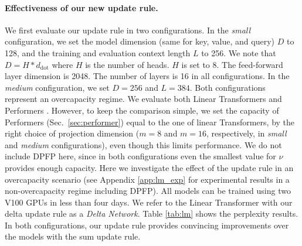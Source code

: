 \documentclass{article}
\theoremstyle{definition}
\begin{document}
\begin{table}[t]
\end{table}

\paragraph{Effectiveness of our new update rule.}
We first evaluate our update rule in two configurations.
In the \textit{small} configuration,
we set the model dimension (same for key, value, and query) $D$ to 128,
and the training and evaluation context length $L$ to 256.
We note that $D=H * d_\text{dot}$ where $H$ is the number of heads.
$H$ is set to 8. The feed-forward layer dimension is 2048.
The number of layers is 16 in all configurations.
In the \textit{medium} configuration, we set $D=256$ and $L=384$.
Both configurations represent an overcapacity regime.
We evaluate both Linear Transformers \citep{katharopoulos2020transformers}
and Performers \citep{choromanski2020rethinking}.
However, to keep the comparison simple,
we set the capacity of Performers (Sec.~\ref{sec:performer})
equal to the one of linear Transformers,
by the right choice of projection dimension ($m=8$ and $m=16$, respectively,
in \textit{small} and \textit{medium} configurations), even though this limits performance.
We do not include DPFP here, since in both configurations even the smallest value
for $\nu$ provides enough capacity.
Here we investigate the effect of the update rule in an overcapacity scenario
(see Appendix \ref{app:lm_exp} for experimental results in a non-overcapacity regime including DPFP).
All models can be trained using two V100 GPUs in less than four days.
We refer to the Linear Transformer with our delta update rule
as a \textit{Delta Network}.
Table \ref{tab:lm} shows the perplexity results.
In both configurations,
our update rule provides convincing improvements
over the models with the sum update rule.
\end{document}
